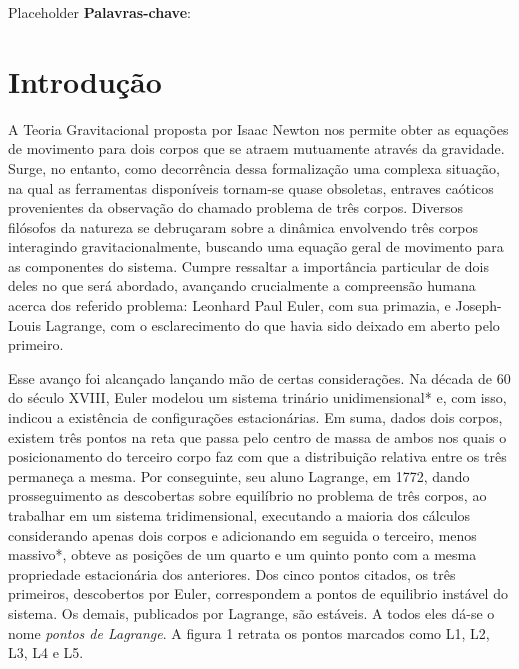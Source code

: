 \documentclass[10pt,twoside,a4paper,brazil]{abntex2}
\begin{document}
   \imprimircapa
   \imprimirfolhaderosto
   \tableofcontents

   \begin{resumo}
      Placeholder
      \vspace{\onelineskip}
      \noindent
      \textbf{Palavras-chave}:
   \end{resumo}

   \chapter{Introdução}
      
   A Teoria Gravitacional proposta por Isaac Newton nos permite obter as equações de movimento para  dois corpos que se atraem mutuamente através da gravidade. Surge, no entanto, como decorrência dessa formalização uma complexa situação, na qual as ferramentas disponíveis tornam-se quase obsoletas, entraves caóticos provenientes da observação do chamado problema de três corpos. Diversos filósofos da natureza se debruçaram sobre a dinâmica envolvendo três corpos interagindo gravitacionalmente, buscando uma equação geral de movimento para as componentes do sistema. Cumpre ressaltar a importância particular de dois deles no que será abordado, avançando crucialmente a compreensão humana acerca dos referido problema: Leonhard Paul Euler, com sua primazia, e Joseph-Louis Lagrange, com o esclarecimento do que havia sido deixado em aberto pelo primeiro.
   
   Esse avanço foi alcançado lançando mão de certas considerações. Na década de 60 do século XVIII, Euler modelou um sistema trinário unidimensional* e, com isso, indicou a existência de configurações estacionárias. Em suma, dados dois corpos, existem três pontos na reta que passa pelo centro de massa de ambos nos quais o posicionamento do terceiro corpo faz com que a distribuição relativa entre os três permaneça a mesma. Por conseguinte, seu aluno Lagrange, em 1772, dando prosseguimento as descobertas sobre equilíbrio no problema de três corpos, ao trabalhar em um sistema tridimensional, executando a maioria dos cálculos considerando apenas dois corpos e adicionando em seguida o terceiro, menos massivo*, obteve as posições de um quarto e um quinto ponto com a mesma propriedade estacionária dos anteriores. Dos cinco pontos citados, os três primeiros, descobertos por Euler, correspondem a pontos de equilibrio instável do sistema. Os demais, publicados por Lagrange, são estáveis. A todos eles dá-se o nome \textit{pontos de Lagrange}. A figura 1 retrata os pontos marcados como L1, L2, L3, L4 e L5.
   
\end{document}
